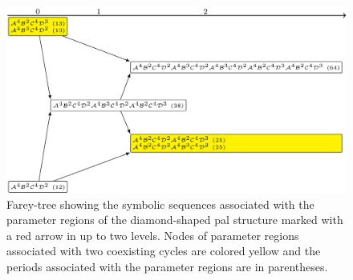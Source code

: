 \begin{figure}
	\centering
	\includegraphics[width=.7 \textwidth]{../Figures/7/7.15+17/adding.png}
	\caption[Farey-tree showing the symbolic sequences associated with the parameter regions of a diamond-shaped  structure]{
		Farey-tree showing the symbolic sequences associated with the parameter regions of the diamond-shaped \gls{pal} structure marked with a red arrow in  up to two levels.
		Nodes of parameter regions associated with two coexisting cycles are colored yellow and the periods associated with the parameter regions are in parentheses.
	}
	\label{fig:add.add.like.corn.vert.tree}
\end{figure}
